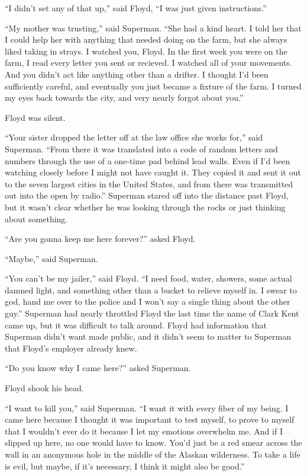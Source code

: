 ``I didn't set any of that up,'' said Floyd, ``I was just given
instructions.''

``My mother was trusting,'' said Superman. ``She had a kind heart. I
told her that I could help her with anything that needed doing on the
farm, but she always liked taking in strays. I watched you, Floyd. In
the first week you were on the farm, I read every letter you sent or
recieved. I watched all of your movements. And you didn't act like
anything other than a drifter. I thought I'd been sufficiently careful,
and eventually you just became a fixture of the farm. I turned my eyes
back towards the city, and very nearly forgot about you.''

Floyd was silent.

``Your sister dropped the letter off at the law office she works for,''
said Superman. ``From there it was translated into a code of random
letters and numbers through the use of a one‐time pad behind lead walls.
Even if I'd been watching closely before I might not have caught it.
They copied it and sent it out to the seven largest cities in the United
States, and from there was transmitted out into the open by radio.''
Superman stared off into the distance past Floyd, but it wasn't clear
whether he was looking through the rocks or just thinking about
something.

``Are you gonna keep me here forever?'' asked Floyd.

``Maybe,'' said Superman.

``You can't be my jailer,'' said Floyd. ``I need food, water, showers,
some actual damned light, and something other than a bucket to relieve
myself in. I swear to god, hand me over to the police and I won't say a
single thing about the other guy.'' Superman had nearly throttled Floyd
the last time the name of Clark Kent came up, but it was difficult to
talk around. Floyd had information that Superman didn't want made
public, and it didn't seem to matter to Superman that Floyd's employer
already knew.

``Do you know why I came here?'' asked Superman.

Floyd shook his head.

``I want to kill you,'' said Superman. ``I want it with every fiber of
my being. I came here because I thought it was important to test myself,
to prove to myself that I wouldn't ever do it because I let my emotions
overwhelm me. And if I slipped up here, no one would have to know. You'd
just be a red smear across the wall in an anonymous hole in the middle
of the Alaskan wilderness. To take a life is evil, but maybe, if it's
necessary, I think it might also be good.''

